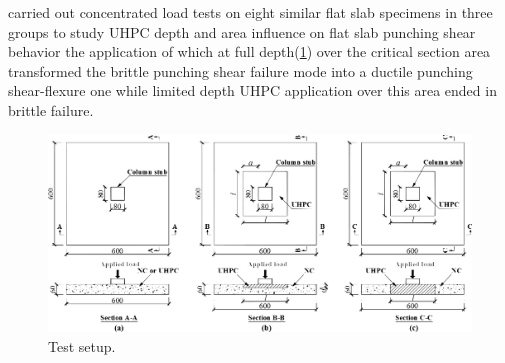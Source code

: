 \documentclass[twocolumn]{article} %
\begin{document}
\cite{qi2021} carried out concentrated load tests on eight similar flat slab specimens in three groups to study UHPC depth and area influence on flat slab punching shear behavior the application of which at full depth(\ref{q2021f1}) over the critical section area transformed the brittle punching shear failure mode into a ductile punching shear-flexure one while limited depth UHPC application over this area ended in brittle failure. 
\begin{figure}\centering
    \includegraphics[width=\columnwidth]{Figures/q2021f1.pdf}\caption{Test setup\citep{qi2021}.}\label{q2021f1}
    \end{figure}
    
\end{document}
